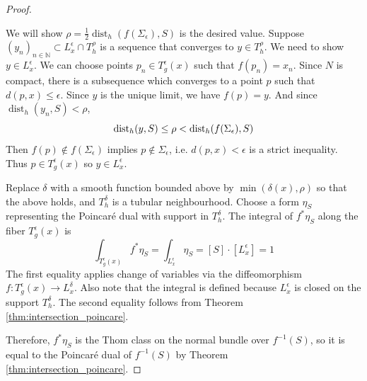 \begin{proof}
\begin{subproof}
		We will show $\rho = \frac{1}{2}\operatorname{dist}_h(f(\Sigma_\epsilon),S)$
		is the desired value. Suppose $(y_n)_{n\in \mathbb{N}} \subset 
		L_x^\epsilon \cap T_h^\rho$ is a sequence that converges to $y\in T^\rho_h$. 
		We need to show $y\in L_x^\epsilon$. We can choose points 
		 $p_n \in T^\epsilon_g(x)$ such that $f(p_n) = x_n$. Since  $N$ is
		 compact, there is a subsequence which converges to a point $p$ such
		 that $d(p,x) \leq \epsilon$. Since $y$ is the unique limit, we have 
		 $f(p) = y$. And since $\operatorname{dist}_h(y_n,S) < \rho$,   
		 \[
			 \operatorname{dist}_h(y,S) \leq \rho < \operatorname{dist}_h(f(\Sigma_\epsilon),S)
		 \] 
		Then $f(p) \notin f(\Sigma_\epsilon)$ implies $p\notin \Sigma_\epsilon$,
		i.e. $d(p,x) < \epsilon$ is a strict inequality. Thus  $p\in
		T^\epsilon_g(x)$ so $y\in L_x^\epsilon$.
	\end{subproof}
	Replace $\delta$ with a smooth function bounded above by $\min(\delta(x),\rho)$ 
	so that the above holds, and $T_h^\delta$ is a tubular neighbourhood.
	Choose a form $\eta_S$ representing the Poincar\'e dual with support in
	$T^\delta_h$. The integral of $f^*\eta_S$ along the fiber  $T^\epsilon_g(x)$
	is 
	 \[
	\int_{T^\epsilon_g(x)} f^*\eta_S 
	= \int_{L_x^\epsilon} \eta_S = [S] \cdot [L_x^\epsilon] = 1
	\] 
	The first equality applies change of variables via the diffeomorphism
	$f:T^\epsilon_g(x) \to L_x^\delta$. Also note that the integral is defined
	because  $L_x^\epsilon$ is closed on the support  $T^\delta_h$.
	The second equality follows from Theorem \ref{thm:intersection_poincare}.
	
	Therefore, $f^*\eta_S$ is the Thom class on the normal bundle over
	$f^{-1}(S)$, so it is equal to the Poincar\'e dual of $f^{-1}(S)$ by Theorem 
	\ref{thm:intersection_poincare}.
\end{proof}
